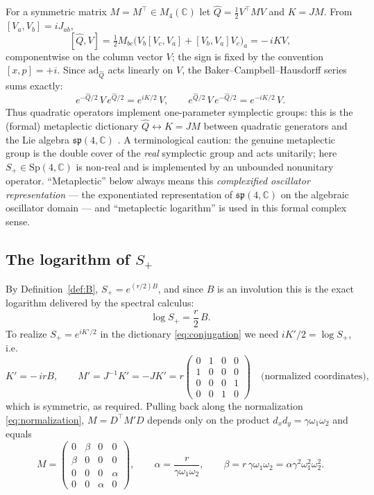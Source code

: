 \documentclass[11pt]{article}
\theoremstyle{definition}
\theoremstyle{remark}
\newcommand{\C}{\mathbb{C}}
\newcommand{\w}{\omega}
\newcommand{\Sp}{\mathrm{Sp}}
\begin{document}
For a symmetric matrix $M=M^{\top}\in M_4(\C)$ let
$\widehat Q=\tfrac12V^{\top}MV$ and $K=JM$.  From $[V_a,V_b]=iJ_{ab}$,
\begin{equation}\label{eq:commutator}
[\widehat Q,V]
=\tfrac12 M_{bc}\big(V_b[V_c,V_a]+[V_b,V_a]V_c\big)_{a}
=-\,iKV ,
\end{equation}
componentwise on the column vector $V$; the sign is fixed by the convention
$[x,p]=+i$.  Since $\mathrm{ad}_{\widehat Q}$ acts linearly on $V$, the
Baker--Campbell--Hausdorff series sums exactly:
\begin{equation}\label{eq:conjugation}
e^{-\widehat Q/2}\,V\,e^{\widehat Q/2}=e^{iK/2}\,V ,
\qquad
e^{\widehat Q/2}\,V\,e^{-\widehat Q/2}=e^{-iK/2}\,V .
\end{equation}
Thus quadratic operators implement one-parameter symplectic groups: this is
the (formal) metaplectic dictionary $\widehat Q\leftrightarrow K=JM$ between
quadratic generators and the Lie algebra $\mathfrak{sp}(4,\C)$
\cite{Folland}.  A terminological caution: the genuine metaplectic group
is the double cover of the \emph{real} symplectic group and acts
unitarily; here $S_+\in\Sp(4,\C)$ is non-real and is implemented by an
unbounded nonunitary operator.  ``Metaplectic'' below always means this
\emph{complexified oscillator representation} --- the exponentiated
representation of $\mathfrak{sp}(4,\C)$ on the algebraic oscillator
domain --- and ``metaplectic logarithm'' is used in this formal complex
sense.

\subsection{The logarithm of $S_+$}

By Definition~\ref{def:B}, $S_+=e^{(r/2)B}$, and since $B$ is an involution
this is the exact logarithm delivered by the spectral calculus:
\begin{equation}
\log S_+=\frac r2\,B .
\end{equation}
To realize $S_+=e^{iK'/2}$ in the dictionary \eqref{eq:conjugation} we need
$iK'/2=\log S_+$, i.e.
\begin{equation}
K'=-\,irB,
\qquad
M'=J^{-1}K'=-JK'
=r\begin{pmatrix}0&1&0&0\\1&0&0&0\\0&0&0&1\\0&0&1&0\end{pmatrix}
\quad\text{(normalized coordinates)},
\end{equation}
which is symmetric, as required.  Pulling back along the normalization
\eqref{eq:normalization}, $M=D^{\top}M'D$ depends only on the product
$d_xd_y=\gamma\w_1\w_2$ and equals
\begin{equation}
M=\begin{pmatrix}
0&\beta&0&0\\ \beta&0&0&0\\ 0&0&0&\alpha\\ 0&0&\alpha&0
\end{pmatrix},
\qquad
\alpha=\frac{r}{\gamma\w_1\w_2},
\qquad
\beta=r\,\gamma\w_1\w_2=\alpha\gamma^2\w_1^2\w_2^2 .
\end{equation}
\end{document}

